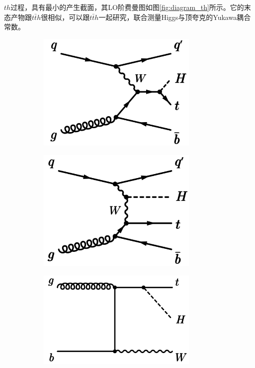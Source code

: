 $th$过程，具有最小的产生截面，其LO阶费曼图如图\ref{fig:diagram_th}所示。它的末态产物跟$t\bar{t}h$很相似，可以跟$t\bar{t}h$一起研究，联合测量Higgs与顶夸克的Yukawa耦合常数。\\
\begin{figure}[h]
\centering
 \begin{subfigure}[b]{0.33\textwidth}
  \includegraphics[width=0.85\textwidth]{fig/diagram_thqb1.png}
  \caption{}
  \label{fig:diagram_VH}
 \end{subfigure}
 \begin{subfigure}[b]{0.33\textwidth}
  \includegraphics[width=0.85\textwidth]{fig/diagram_thqb2.png}
  \caption{}
  \label{fig:diagram_ggzh1}
 \end{subfigure}
 \begin{subfigure}[b]{0.33\textwidth}
  \includegraphics[width=0.85\textwidth]{fig/diagram_thW1.png}

\end{subfigure}
\end{figure}
